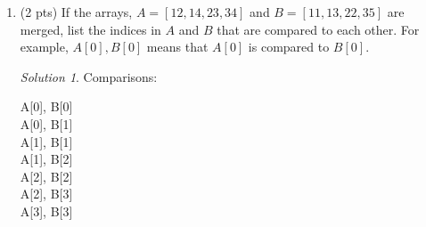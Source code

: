 \documentclass[12pt]{article}
\theoremstyle{remark}
\newtheorem*{solution}{Solution}
\begin{document}
\begin{enumerate}
\item (2 pts) If the arrays, $A=[12, 14, 23, 34]$ and $B=[11, 13, 22, 35]$ are merged, list the indices in $A$ and $B$ that are compared to each other. For example, $A[0], B[0]$ means that $A[0]$ is compared to $B[0]$.
\begin{solution} Comparisons:
\begin{center}
A[0], B[0] \\
A[0], B[1] \\
A[1], B[1] \\
A[1], B[2] \\
A[2], B[2] \\
A[2], B[3] \\
A[3], B[3] \\
\end{center}
\end{solution}


\end{enumerate}
\end{document}
